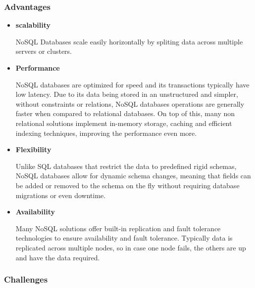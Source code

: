 \subsubsection{Advantages}
\begin{itemize}

	\item \textbf{scalability}

	      NoSQL Databases scale easily horizontally by spliting data across
	      multiple servers or clusters.

	\item \textbf{Performance}

	      NoSQL databases are optimized for speed and its transactions typically have
	      low latency. Due to its data being stored in an unstructured and simpler,
	      without constraints or relations, NoSQL databases operations are generally
	      faster when compared to relational databases. On top of this, many non
	      relational solutions implement in-memory storage, caching and efficient
	      indexing techniques, improving the performance even more.

	\item \textbf{Flexibility}

	      Unlike SQL databases that restrict the data to predefined rigid schemas,
	      NoSQL databases allow for dynamic schema changes, meaning that fields can
	      be added or removed to the schema on the fly without requiring database
	      migrations or even downtime.

	\item \textbf{Availability}

	      Many NoSQL solutions offer built-in replication and fault tolerance
	      technologies to ensure availability and fault tolerance. Typically data is
	      replicated across multiple nodes, so in case one node fails, the others
	      are up and have the data required.

\end{itemize}

\subsubsection{Challenges}

